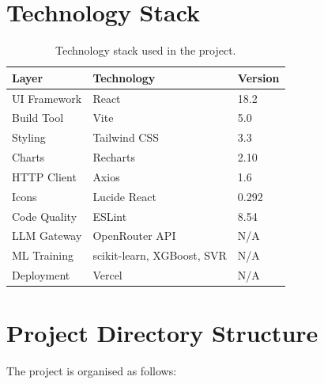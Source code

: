 \documentclass[12pt,a4paper]{report}
\begin{document}
\section{Technology Stack}
\begin{table}[H]
\centering
\caption{Technology stack used in the project.}
\label{tab:techstack}
\begin{tabular}{@{} l l l @{}}
\toprule
\textbf{Layer} & \textbf{Technology} & \textbf{Version} \\
\midrule
UI Framework     & React               & 18.2   \\
Build Tool       & Vite                & 5.0    \\
Styling          & Tailwind CSS        & 3.3    \\
Charts           & Recharts            & 2.10   \\
HTTP Client      & Axios               & 1.6    \\
Icons            & Lucide React        & 0.292  \\
Code Quality     & ESLint              & 8.54   \\
LLM Gateway      & OpenRouter API      & N/A    \\
ML Training      & scikit-learn, XGBoost, SVR & N/A    \\
Deployment       & Vercel              & N/A    \\
\bottomrule
\end{tabular}
\end{table}
\section{Project Directory Structure}

The project is organised as follows:
\end{document}
